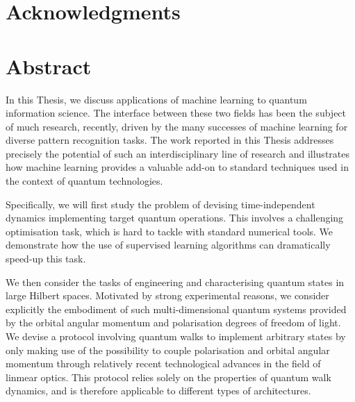\clearpage


\chapter*{Acknowledgments}

\clearpage


\chapter*{Abstract}

In this Thesis, we discuss applications of machine learning to quantum information science.
The interface between these two fields has been the subject of much research, recently, driven by the many successes of machine learning for diverse pattern recognition tasks. The work reported in this Thesis addresses precisely the potential of such an interdisciplinary line of research and illustrates how machine learning provides a valuable add-on to standard techniques used in the context of quantum technologies.

Specifically, we will first study the problem of devising time-independent dynamics implementing target quantum operations.
This involves a challenging optimisation task, which is hard to tackle with standard numerical tools.
We demonstrate how the use of supervised learning algorithms can dramatically speed-up this task.

We then consider the tasks of engineering and characterising quantum states in large Hilbert spaces. Motivated by strong experimental reasons, we consider explicitly the embodiment of such multi-dimensional quantum systems provided by the orbital angular momentum and polarisation degrees of freedom of light.
We devise a protocol involving quantum walks to implement arbitrary states by only making use of the possibility to couple polarisation and orbital angular momentum through relatively recent technological advances in the field of linmear optics.
This protocol relies solely on the properties of quantum walk dynamics, and is therefore applicable to different types of architectures.

